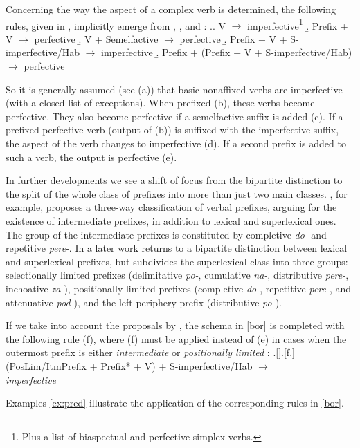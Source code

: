 Concerning the way the aspect of a complex verb is determined, the following rules, given in \cite{Borer:13}, implicitly emerge from \citet{Ramchand:04}, \citet{Romanova:04}, and \citet{Svenonius:04b}:
\ex.\label{bor}\a. V $\rightarrow$ {imperfective}\footnote{Plus a list of biaspectual and perfective simplex verbs.}
\b. Prefix + V $\rightarrow$ {perfective}
\b. V + Semelfactive $\rightarrow$ {perfective}
\b. Prefix + V + S-imperfective/Hab $\rightarrow$ {imperfective}
\b. Prefix + (Prefix + V + S-imperfective/Hab) $\rightarrow$ {perfective}

So it is generally assumed (see (a)) that basic nonaffixed verbs are imperfective (with a closed list of exceptions). When prefixed (b), these verbs become perfective. They also become perfective if a semelfactive suffix is added (c). If a prefixed perfective verb (output of (b)) is suffixed with the imperfective suffix, the aspect of the verb changes to imperfective (d). If a second prefix is added to such a verb, the output is perfective (e).

In further developments we see a shift of focus from the bipartite distinction to the split of the whole class of prefixes into more than just two main classes. \citet{Tatevosov:07}, for example, proposes a three-way classification of verbal prefixes, arguing for the existence of intermediate prefixes, in addition to lexical and superlexical ones. The group of the intermediate prefixes is constituted by completive \textit{do}- and repetitive \textit{pere}-. In a later work \citet{Tatevosov:09} returns to a bipartite distinction between lexical and superlexical prefixes, but subdivides the superlexical class into three groups: selectionally limited prefixes (delimitative \textit{po-}, cumulative \textit{na-}, distributive \textit{pere-}, inchoative \textit{za-}), positionally limited prefixes (completive \textit{do-}, repetitive \textit{pere-}, and attenuative \textit{pod-}), and the left periphery prefix (distributive \textit{po-}).

If we take into account the proposals by \citet{Tatevosov:07, Tatevosov:09}, the schema in \ref{bor} is completed with the following rule (f), where (f) must be applied instead of (e) in cases when the outermost prefix is either \textit{intermediate} \citep{Tatevosov:07} or \textit{positionally limited} \citep{Tatevosov:09}: 
\ex.[]\a.[f.] (PosLim/ItmPrefix + Prefix* + V) + S-imperfective/Hab $\rightarrow$\\ \textit{imperfective} 

Examples \ref{ex:pred} illustrate the application of the corresponding rules in \ref{bor}.

